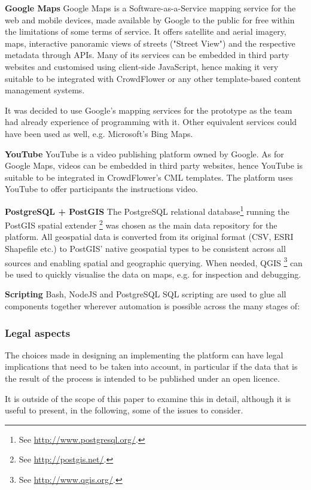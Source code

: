 \textbf{Google Maps} Google Maps is a Software-as-a-Service mapping service for the web and mobile devices, made available by Google to the public for free within the limitations of some terms of service. It offers satellite and aerial imagery, maps, interactive panoramic views of streets ("Street View") and the respective metadata through APIs. Many of its services can be embedded in third party websites and customised using client-side JavaScript, hence making it very suitable to be integrated with CrowdFlower or any other template-based content management systems. 

It was decided to use Google's mapping services for the prototype as the team had already experience of programming with it. Other equivalent services could have been used as well, e.g. Microsoft's Bing Maps.

\textbf{YouTube} YouTube is a video publishing platform owned by Google. As for Google Maps, videos can be embedded in third party websites, hence YouTube is suitable to be integrated in CrowdFlower's CML templates. The platform uses YouTube to offer participants the instructions video.  

\textbf{PostgreSQL + PostGIS} The PostgreSQL relational database\footnote{See \url{http://www.postgresql.org/}.} running the PostGIS spatial extender \footnote{See \url{http://postgis.net/}.} was chosen as the main data repository for the platform. All geospatial data is converted from its original format (CSV, ESRI Shapefile etc.) to PostGIS' native geospatial types to be consistent across all sources and enabling spatial and geographic querying. When needed, QGIS \footnote{See \url{http://www.qgis.org/}.} can be used to quickly visualise the data on maps, e.g. for inspection and debugging.

\textbf{Scripting} Bash, NodeJS and PostgreSQL SQL scripting are used to glue all components together wherever automation is possible across the many stages of:  

\subsubsection{Legal aspects}

The choices made in designing an implementing the platform can have legal implications that need to be taken into account, in particular if the data that is the result of the process is intended to be published under an open licence.

It is outside of the scope of this paper to examine this in detail, although it is useful to present, in the following, some of the issues to consider.

